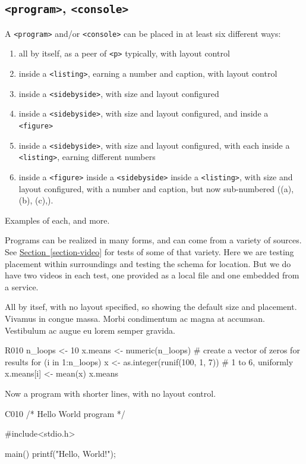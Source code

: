 \documentclass{sn-jnl}
\theoremstyle{thmstyleone}%
\theoremstyle{thmstyletwo}%
\theoremstyle{thmstylethree}%
\newcommand{\xreffont}{\relax}
\newcommand{\mono}[1]{\texttt{#1}}
\numberwithin{equation}{section}
\begin{document}
\subsection{\mono{<program>}, \mono{<console>}}\label{atomic-program}%
A \mono{<program>} and\slash{}or \mono{<console>} can be placed in at least six  different ways:%
\begin{enumerate}
\item{}all by itself, as a peer of \mono{<p>} typically, with layout control%
\item{}inside a \mono{<listing>}, earning a number and caption, with layout control%
\item{}inside a \mono{<sidebyside>}, with size and layout configured%
\item{}inside a \mono{<sidebyside>}, with size and layout configured, and inside a \mono{<figure>}%
\item{}inside a \mono{<sidebyside>}, with size and layout configured, with each inside a \mono{<listing>}, earning different numbers%
\item{}inside a \mono{<figure>} inside a \mono{<sidebyside>} inside a \mono{<listing>}, with size and layout configured, with a number and caption, but now sub-numbered ((a), (b), (c),\textellipsis{}).%
\end{enumerate}
Examples of each, and more.%
\par
Programs can be realized in many forms, and can come from a variety of sources.  See \hyperref[section-video]{Section~{\xreffont\ref{section-video}}} for tests of some of that variety.  Here we are testing placement within surroundings and testing the schema for location.  But we do have two videos in each test, one provided as a local file and one embedded from a service.%
\par
All by itsef, with no layout specified, so showing the default size and placement.  Vivamus in congue massa. Morbi condimentum ac magna at accumsan. Vestibulum ac augue eu lorem semper gravida.%
\begin{program}{R}{0}{1}{0}
n_loops <- 10
x.means <- numeric(n_loops)  # create a vector of zeros for results
for (i in 1:n_loops){
    x <- as.integer(runif(100, 1, 7))  # 1 to 6, uniformly
    x.means[i] <- mean(x)
}
x.means
\end{program}
Now a program with shorter lines, with no layout control.%
\begin{program}{C}{0}{1}{0}
/* Hello World program */

#include<stdio.h>

main()
{
    printf("Hello, World!");
}
\end{program}
\end{document}
